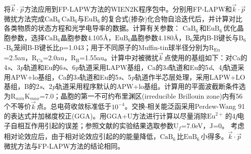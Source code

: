 将$\vec k\cdot\vec p$方法应用到\textrm{FP-LAPW}方法的\textrm{WIEN2K}程序包中。分别用\textrm{FP-LAPW}和$\vec k\cdot\vec p$\,微扰方法完成$\mathrm{CaB}_6$\,$\mathrm{CaB}_6$与$\mathrm{EuB}_6$\,的复合式(掺杂)化合物自洽迭代后，并计算对比各类物质的状态方程和光学电导率的数据。计算有关参数：%
$\mathrm{CaB}_6$\,和$\mathrm{EuB}_6$\,优化晶胞参数，选择$\mathrm{CaB}_6$晶胞参数4.105{\AA}，$\mathrm{EuB}_6$晶胞参数4.180{\AA}，$\mathrm{B}_6$笼内\textrm{B-B}键长与$\mathrm{B}_6$-$\mathrm{B}_6$笼间\textrm{B-B}键长比\textrm{p}=1.043；用于不同原子的\textrm{Muffin-tin}球半径分别为$\mathrm R_{\mathrm{Eu}}$=2.5\textrm{au}，$\mathrm R_{\mathrm{Ca}}$=2.0\textrm{au}，$\mathrm R_{\mathrm B}$=1.55\textrm{au}。计算中对被微扰$\vec k$\,点使用的基组如下：对\textrm{Ca}的4\textit{s}、3\textit{p}轨道和\textrm{Eu}的6\textit{s}、6\textit{p}轨道采用\textrm{LAPW}基组，\textrm{Ca}的3\textit{d}轨道和\textrm{Eu}的5\textit{d}、4\textit{f}轨道采用\textrm{APW+lo}基组，\textrm{Ca}的3\textit{s}轨道和\textrm{Eu}的5\textit{s}、5\textit{p}轨道作半芯层处理，采用\textrm{LAPW+LO}基组，\textrm{B}的2\textit{s}、2\textit{p}轨道采用程序默认的\textrm{APW+lo}基组。计算用的平面波截断条件选为$\mathrm R_{min}$$\mathrm K_{max}$=7.0；晶胞的第一不可约布里渊区(\textrm{irreducible Brillouin zone})内有56个不等价$\vec k$\,点。总电荷收敛标准低于$10^{-4}$。交换-相关能泛函采用\textrm{Perdew-Wang} 91的表达式并加梯度校正(\textrm{GGA})。用\textrm{GGA+U}方法进行计算以尽量消除$\mathrm{Eu}^{2+}$\,的4\textit{f}电子自相互作用引起的误差；参照文献\cite{SSC50-903_1984}的实验结果选取参数$\mathrm{U}_{\mathit f}$=7.0\textrm{eV}，\textrm{J}=0。%
考虑相对论效应后，由于相对论效应引起的的能量降低，$\mathrm{CaB}_6$\,比$\mathrm{EuB}_6$\,小得多。$\vec k\cdot\vec p$\,微扰方法与\textrm{FP-LAPW}方法的结论相同。
%  
$$
